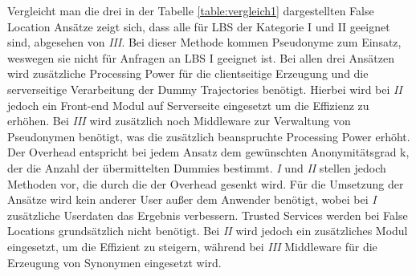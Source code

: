 Vergleicht man die drei in der Tabelle \ref{table:vergleich1} dargestellten False Location Ansätze zeigt sich, dass alle für LBS der Kategorie I und II geeignet sind, abgesehen von \textit{III}. Bei dieser Methode kommen Pseudonyme zum Einsatz, weswegen sie nicht für Anfragen an LBS I geeignet ist. Bei allen drei Ansätzen wird zusätzliche Processing Power für die clientseitige Erzeugung und die serverseitige Verarbeitung der Dummy Trajectories benötigt. Hierbei wird bei \textit{II} jedoch ein Front-end Modul auf Serverseite eingesetzt um die Effizienz zu erhöhen. Bei \textit{III} wird zusätzlich noch Middleware zur Verwaltung von Pseudonymen benötigt, was die zusätzlich beanspruchte Processing Power erhöht. Der Overhead entspricht bei jedem Ansatz dem gewünschten Anonymitätsgrad k, der die Anzahl der übermittelten Dummies bestimmt. \textit{I} und \textit{II} stellen jedoch Methoden vor, die durch die der Overhead gesenkt wird. Für die Umsetzung der Ansätze wird kein anderer User außer dem Anwender benötigt, wobei bei \textit{I} zusätzliche Userdaten das Ergebnis verbessern. Trusted Services werden bei False Locations grundsätzlich nicht benötigt. Bei \textit{II} wird jedoch ein zusätzliches Modul eingesetzt, um die Effizient zu steigern, während bei \textit{III} Middleware für die Erzeugung von Synonymen eingesetzt wird.